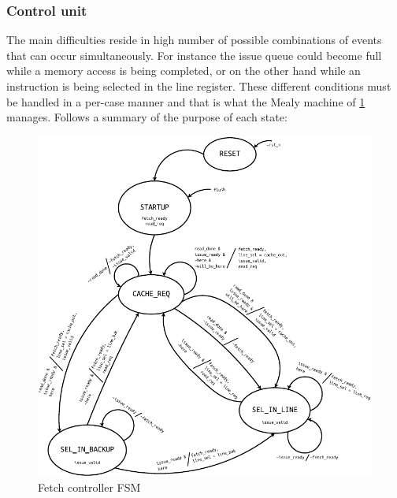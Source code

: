 \subsubsection{Control unit}
The main difficulties reside in high number of possible combinations of events that can occur simultaneously. For instance the issue queue could become full while a memory access is being completed, or on the other hand while an instruction is being selected in the line register. These different conditions must be handled in a per-case manner and that is what the Mealy machine of \cref{fig:fetch_controller_fsm} manages.  Follows a summary of the purpose of each state:
\begin{figure}[hbt]
  \centering
  \includegraphics[width=\textwidth]{img/fetch_controller_fsm.pdf}
  \caption{Fetch controller \acs{FSM}}
  \label{fig:fetch_controller_fsm}
\end{figure}
